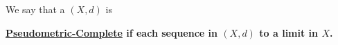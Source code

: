 \label{def:pseudometriccomplete}
\newcommand{\PseudometricComplete}[0]{
    \bf \hyperref[def:pseudometriccomplete]{Pseudometric-Complete} \rm
}
\begin{df}
    We say that a \PseudometricSpace $(X,d)$ is 
    \PseudometricComplete if each \PseudometricCauchySequence sequence in $(X,d)$ \PseudometricConverges to a limit in $X$. 
    \end{df}